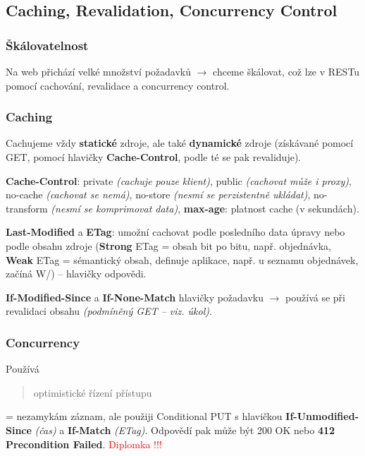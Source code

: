 \subsection{Caching, Revalidation, Concurrency Control}

\subsubsection*{Škálovatelnost}

Na web přichází velké množství požadavků $\to$ chceme škálovat, což lze v RESTu pomocí cachování, revalidace a concurrency control.

\subsubsection*{Caching}

Cachujeme vždy \textbf{statické} zdroje, ale také \textbf{dynamické} zdroje (získávané pomocí GET, pomocí hlavičky \textbf{Cache-Control}, podle té se pak revaliduje).

\vspace{4pt}
\noindent \textbf{Cache-Control}: private \textit{(cachuje pouze klient)}, public \textit{(cachovat může i proxy)}, no-cache \textit{(cachovat se nemá)}, no-store \textit{(nesmí se perzistentně ukládat)}, no-transform \textit{(nesmí se komprimovat data)}, \textbf{max-age}: platnost cache (v sekundách).

\vspace{4pt}
\noindent \textbf{Last-Modified} a \textbf{ETag}: umožní cachovat podle posledního data úpravy nebo podle obsahu zdroje (\textbf{Strong} ETag = obsah bit po bitu, např. objednávka, \textbf{Weak} ETag = sémantický obsah, definuje aplikace, např. u seznamu objednávek, začíná W/) -- hlavičky odpovědi.

\vspace{2pt}
\noindent \textbf{If-Modified-Since} a \textbf{If-None-Match} hlavičky požadavku $\to$ používá se při revalidaci obsahu \textit{(podmíněný GET -- viz. úkol)}.

\subsubsection*{Concurrency}

Používá \blockquote{optimistické řízení přístupu} = nezamykám záznam, ale použiji Conditional PUT s hlavičkou \textbf{If-Unmodified-Since} \textit{(čas)} a \textbf{If-Match} \textit{(ETag)}. Odpovědí pak může být 200 OK nebo \textbf{412 Precondition Failed}. \textcolor{red}{Diplomka !!!}

